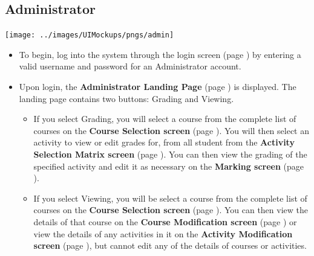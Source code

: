 \documentclass{article}
\begin{document}
\subsection{Administrator}
\centerline{\texttt{[image: ../images/UIMockups/pngs/admin]}}
\begin{itemize}
  \item To begin, log into the system through the login screen (page \pageref{login})
    by entering a valid username and password for an Administrator account.
  \item Upon login, the \textbf{Administrator Landing Page} (page \pageref{landPg})
    is displayed. The landing page contains two buttons: Grading and Viewing.
    \begin{itemize}
    \item If you select Grading, you will select a course from the complete list of 
      courses on the \textbf{Course Selection screen} (page \pageref{courseSel}). 
      You will then select an 
      activity to view or edit grades for, from all student from the \textbf{Activity 
    	 Selection Matrix screen} (page \pageref{actSel}). You can then view the 
	 grading of the specified
      activity and edit it as necessary on the \textbf{Marking screen} (page
      \pageref{marking}).
    \item If you select Viewing, you will be select a course from the complete list of 
      courses on the \textbf{Course Selection screen} (page \pageref{courseSel}). You can then view the
      details of that course on the \textbf{Course Modification screen} (page \pageref{createCourse})
      or view the details of any activities in it on the \textbf{Activity Modification screen}
      (page \pageref{newActivity}), but
      cannot edit any of the details of courses or activities.
    \end{itemize}
\end{itemize}
\end{document}
